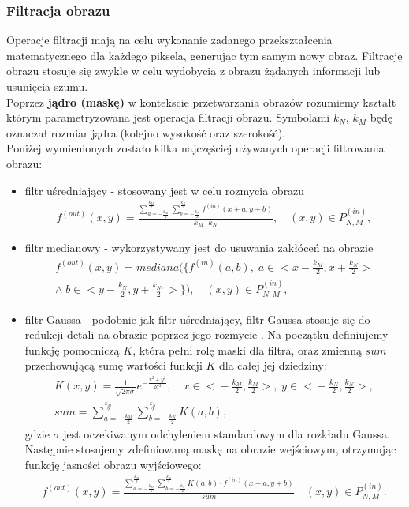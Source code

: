 \subsubsection{Filtracja obrazu}
Operacje filtracji mają na celu wykonanie zadanego przekształcenia matematycznego dla każdego piksela, generując tym samym nowy obraz. Filtrację obrazu stosuje się zwykle w celu wydobycia z obrazu żądanych informacji lub usunięcia szumu. \\
Poprzez \textbf{jądro (maskę)} w kontekscie przetwarzania obrazów rozumiemy kształt którym parametryzowana jest operacja filtracji obrazu. Symbolami $k_N$, $k_M$ będę oznaczał rozmiar jądra (kolejno wysokość oraz szerokość).\\
Poniżej wymienionych zostało kilka najczęściej używanych operacji filtrowania obrazu:
\begin{itemize}
\item filtr uśredniający - stosowany jest w celu rozmycia obrazu
  \begin{gather*}
    f^{(out)}(x, y) = \frac{\sum\limits_{a=-\frac{k_M}{2}}^{\frac{k_M}{2}} \sum\limits_{b=-\frac{k_N}{2}}^{\frac{k_N}{2}} f^{(in)}(x + a, y + b)}{k_M \cdot k_N}, \quad (x, y) \in P^{(in)}_{N,M},
  \end{gather*}
\item filtr medianowy - wykorzystywany jest do usuwania zakłóceń na obrazie \cite{pratt75}
  \begin{gather*}
    f^{(out)}(x, y) = mediana(\{f^{(in)}(a, b), \;a \in \big< x -\frac{k_M}{2}, x + \frac{k_N}{2}\big> \\
    \wedge\; b \in \big< y - \frac{k_N}{2}, y + \frac{k_N,}{2}\big>\}), \quad (x, y) \in P^{(in)}_{N,M},
  \end{gather*}
\item filtr Gaussa - podobnie jak filtr uśredniający, filtr Gaussa stosuje się do redukcji detali na obrazie poprzez jego rozmycie \cite{shapiro01}. Na początku definiujemy funkcję pomocniczą $K$, która pełni rolę maski dla filtra, oraz zmienną $sum$ przechowującą sumę wartości funkcji $K$ dla całej jej dziedziny:
  \begin{gather*}
    K(x, y) = \frac{1}{\sqrt{2 \pi \sigma}} e^{-\frac{x^2+y^2}{2 \sigma^2}}, \quad x \in \big< -\frac{k_M}{2}, \frac{k_M}{2} \big>, \; y \in \big< -\frac{k_N}{2}, \frac{k_N}{2} \big>, \\
    sum = \sum\limits_{a=-\frac{k_M}{2}}^{\frac{k_M}{2}} \sum\limits_{b=-\frac{k_N}{2}}^{\frac{k_N}{2}} K(a, b),
  \end{gather*} 
  gdzie $\sigma$ jest oczekiwanym odchyleniem standardowym dla rozkładu Gaussa.
  Następnie stosujemy zdefiniowaną maskę na obrazie wejściowym, otrzymując funkcję jasności obrazu wyjściowego:
  \begin{gather*}
    f^{(out)}(x, y) = \frac{\sum\limits_{a=-\frac{k_M}{2}}^{\frac{k_M}{2}} \sum\limits_{b=-\frac{k_N}{2}}^{\frac{k_N}{2}} K(a, b) \cdot f^{(in)}(x + a, y + b)}{sum}\quad (x, y) \in P^{(in)}_{N,M}.
  \end{gather*}
\end{itemize}

